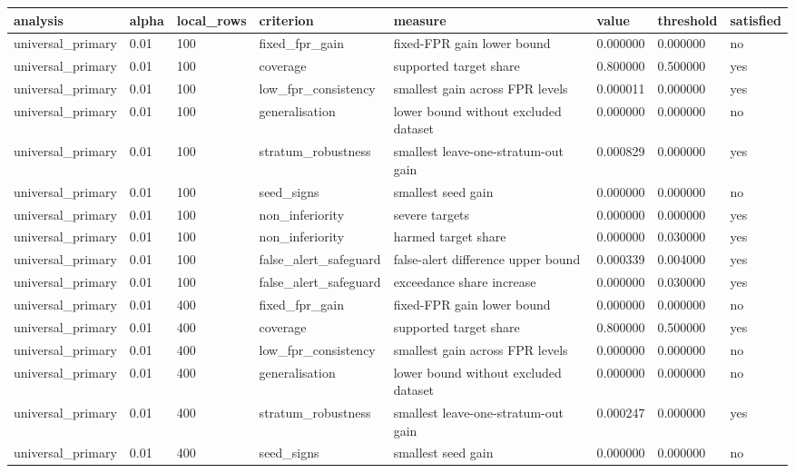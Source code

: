 \begin{tabular}{llllllll}
\toprule
analysis & alpha & local\_rows & criterion & measure & value & threshold & satisfied \\
\midrule
universal\_primary & 0.01 & 100 & fixed\_fpr\_gain & fixed-FPR gain lower bound & 0.000000 & 0.000000 & no \\
universal\_primary & 0.01 & 100 & coverage & supported target share & 0.800000 & 0.500000 & yes \\
universal\_primary & 0.01 & 100 & low\_fpr\_consistency & smallest gain across FPR levels & 0.000011 & 0.000000 & yes \\
universal\_primary & 0.01 & 100 & generalisation & lower bound without excluded dataset & 0.000000 & 0.000000 & no \\
universal\_primary & 0.01 & 100 & stratum\_robustness & smallest leave-one-stratum-out gain & 0.000829 & 0.000000 & yes \\
universal\_primary & 0.01 & 100 & seed\_signs & smallest seed gain & 0.000000 & 0.000000 & no \\
universal\_primary & 0.01 & 100 & non\_inferiority & severe targets & 0.000000 & 0.000000 & yes \\
universal\_primary & 0.01 & 100 & non\_inferiority & harmed target share & 0.000000 & 0.030000 & yes \\
universal\_primary & 0.01 & 100 & false\_alert\_safeguard & false-alert difference upper bound & 0.000339 & 0.004000 & yes \\
universal\_primary & 0.01 & 100 & false\_alert\_safeguard & exceedance share increase & 0.000000 & 0.030000 & yes \\
universal\_primary & 0.01 & 400 & fixed\_fpr\_gain & fixed-FPR gain lower bound & 0.000000 & 0.000000 & no \\
universal\_primary & 0.01 & 400 & coverage & supported target share & 0.800000 & 0.500000 & yes \\
universal\_primary & 0.01 & 400 & low\_fpr\_consistency & smallest gain across FPR levels & 0.000000 & 0.000000 & no \\
universal\_primary & 0.01 & 400 & generalisation & lower bound without excluded dataset & 0.000000 & 0.000000 & no \\
universal\_primary & 0.01 & 400 & stratum\_robustness & smallest leave-one-stratum-out gain & 0.000247 & 0.000000 & yes \\
universal\_primary & 0.01 & 400 & seed\_signs & smallest seed gain & 0.000000 & 0.000000 & no \\

\end{tabular}
